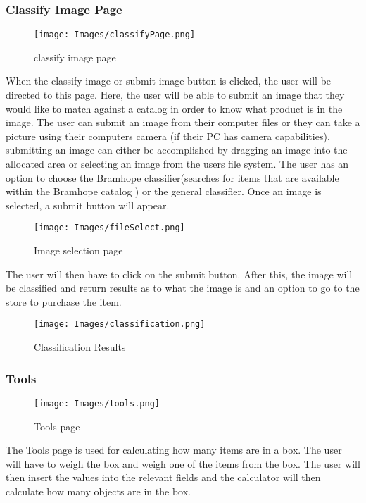\documentclass[a4paper, 12pt]{article}
\begin{document}
\subsubsection{Classify Image Page}
\begin{figure}[h!]
\texttt{[image: Images/classifyPage.png]}
\centering
\caption{classify image page} 
\end{figure}
When the classify image or submit image button is clicked, the user will be directed to this page. Here, the user will be able to submit an image that they would like to match against a catalog in order to know what product is in the image. The user can submit an image from their computer files or they can take a picture using their computers camera (if their PC has camera capabilities).\linebreak
submitting an image can either be accomplished by dragging an image into the allocated area or selecting an image from the users file system.\linebreak
The user has an option to choose the Bramhope classifier(searches for items that are available within the Bramhope catalog ) or the general classifier. 
Once an image is selected, a submit button will appear.
\linebreak
\newpage
\begin{figure}[!ht]
\texttt{[image: Images/fileSelect.png]}
\centering
\caption{Image selection page} 
\end{figure}
The user will then have to click on the submit button.
After this, the image will be classified and return results as to what the image is and an option to go to the store to purchase the item.
\begin{figure}[!ht]
\texttt{[image: Images/classification.png]}
\centering
\caption{Classification Results} 
\end{figure}
\newpage
\subsubsection{Tools}
\begin{figure}[!ht]
\texttt{[image: Images/tools.png]}
\centering
\caption{Tools page} 
\end{figure}
The Tools page is used for calculating how many items are in a box.
The user will have to weigh the box and weigh one of the items from the box. The user will then insert the values into the relevant fields and the calculator will then calculate how many objects are in the box. 
\linebreak
\end{document}
